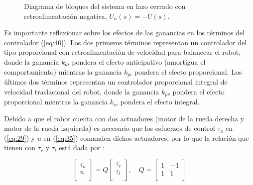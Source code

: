 \documentclass{article}
\begin{document}
\begin{figure}[H]
    \centering
        \caption{Diagrama de bloques del sistema en lazo cerrado con retroalimentación negativa, $U_n(s)=-U(s)$.}
        \label{fig:6}
    \end{figure}
Es importante reflexionar sobre los efectos de las ganancias en los términos del controlador (\ref{eq:40}). Los dos primeros términos representan un controlador del tipo proporcional con retroalimentación de velocidad para balancear el robot, donde la ganancia $k_{di}$ pondera el efecto anticipativo (amortigua el comportamiento) mientras la
ganancia $k_{pi}$ pondera el efecto proporcional. Los últimos dos términos representan un controlador proporcional integral de velocidad traslacional del robot, donde la ganancia $k_{pv}$ pondera el efecto proporcional mientras la ganancia $k_{iv}$ pondera el efecto integral.

Debido a que el robot cuenta con dos actuadores (motor de la rueda derecha y motor de la rueda izquierda) es necesario que los esfuerzos de control $\tau_a$ en (\ref{eq:29}) y $u$ en (\ref{eq:35}) comanden dichos actuadores, por lo que la relación que tienen con $\tau_r$ y $\tau_l$ está dada por \citep{HernandezBook2024}:

\begin{equation}
    \begin{bmatrix}
        \tau_a \\
        u \\
    \end{bmatrix} 
    = Q \begin{bmatrix}
        \tau_r\\
        \tau_l\\
    \end{bmatrix}, \quad 
    Q=\begin{bmatrix}
        1 & -1 \\
        1 & 1 \\
    \end{bmatrix}
    \label{eq:45}
\end{equation}
\end{document}
